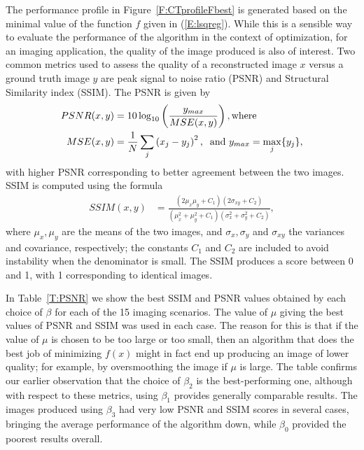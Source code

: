 \documentclass[]{interact}
\theoremstyle{plain}%
\theoremstyle{definition}
\theoremstyle{remark}
\begin{document}
The performance profile in Figure~\ref{F:CTprofileFbest} is generated based on the minimal value of the function $f$ given in (\ref{E:lsqreg}). While this is a sensible way to evaluate the performance of the algorithm in the context of optimization, for an imaging application, the quality of the image produced is also of interest. Two common metrics used to assess the quality of a reconstructed image $x$ versus a ground truth image $y$ are peak signal to noise ratio (PSNR) and Structural Similarity index (SSIM)\cite{SSIM}. The PSNR is given by
\begin{align}
PSNR(x,y) &= 10 \log_{10} \left( \frac{y_{max}}{MSE(x,y)} \right), \textrm{where} \label{E:PSNR} \\MSE(x,y) &= \frac{1}{N}\sum_j \left(x_{j} - y_{j}\right)^2, \: \textrm{ and } y_{max} = \max_j \{ y_j \}\notag, 
\end{align}
with higher PSNR corresponding to better agreement between the two images. SSIM is computed using the formula
\begin{align}
SSIM(x,y) &= \frac{ (2 \mu_x \mu_y + C_1)(2 \sigma_{xy} + C_2)}{(\mu_x^2 + \mu_y^2 + C_1)(\sigma_x^2 + \sigma_y^2 + C_2)},\label{E:SSIM}
\end{align}
where $\mu_x, \mu_y$ are the means of the two images, and $\sigma_x, \sigma_y$ and $\sigma_{xy}$ the variances and covariance, respectively; the constants $C_1$ and $C_2$ are included to avoid instability when the denominator is small. The SSIM produces a score between 0 and 1, with 1 corresponding to identical images. 

In Table~\ref{T:PSNR} we show the best SSIM and PSNR values obtained by each choice of $\beta$ for each of the 15 imaging scenarios. The value of $\mu$ giving the best values of PSNR and SSIM was used in each case. The reason for this is that if the value of $\mu$ is chosen to be too large or too small, then an algorithm that does the best job of minimizing $f(x)$ might in fact end up producing an image of lower quality; for example, by oversmoothing the image if $\mu$ is large. The table confirms our earlier observation that the choice of $\beta_2$ is the best-performing one, although with respect to these metrics, using $\beta_1$ provides generally comparable results. The images produced using $\beta_3$ had very low PSNR and SSIM scores in several cases, bringing the average performance of the algorithm down, while $\beta_0$ provided the poorest results overall.
\end{document}

